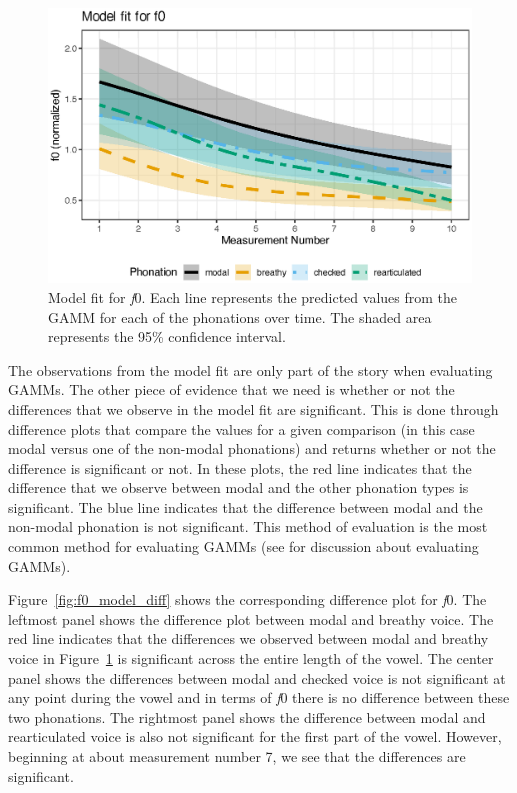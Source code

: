 \begin{figure}[h!]
    \centering
    \includegraphics[width = \linewidth]{images/LCH_GAMMs/f0_model_fit.eps}
    \caption{Model fit for \textit{f}0. Each line represents the predicted values from the GAMM for each of the phonations over time. The shaded area represents the 95\% confidence interval.}
    \label{fig:f0_model_fit}
\end{figure}

The observations from the model fit are only part of the story when evaluating GAMMs. The other piece of evidence that we need is whether or not the differences that we observe in the model fit are significant. This is done through difference plots that compare the values for a given comparison (in this case modal versus one of the non-modal phonations) and returns whether or not the difference is significant or not. In these plots, the red line indicates that the difference that we observe between modal and the other phonation types is significant. The blue line indicates that the difference between modal and the non-modal phonation is not significant. This method of evaluation is the most common method for evaluating GAMMs (see \cite{soskuthyEvaluatingGeneralisedAdditive2021} for discussion about evaluating GAMMs). 

Figure~\ref{fig:f0_model_diff} shows the corresponding difference plot for \textit{f}0. The leftmost panel shows the difference plot between modal and breathy voice. The red line indicates that the differences we observed between modal and breathy voice in Figure~\ref{fig:f0_model_fit} is significant across the entire length of the vowel. The center panel shows the differences between modal and checked voice is not significant at any point during the vowel and in terms of \textit{f}0 there is no difference between these two phonations. The rightmost panel shows the difference between modal and rearticulated voice is also not significant for the first part of the vowel. However, beginning at about measurement number 7, we see that the differences are significant.

